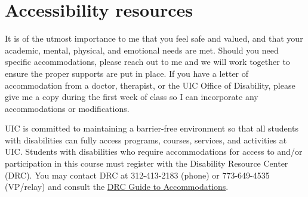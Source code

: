 \documentclass[
]{report}
\begin{document}
\hypertarget{accessibility-resources}{%
\section*{Accessibility resources}\label{accessibility-resources}}

It is of the utmost importance to me that you feel safe and valued, and that your academic, mental, physical, and emotional needs are met. Should you need specific accommodations, please reach out to me and we will work together to ensure the proper supports are put in place. If you have a letter of accommodation from a doctor, therapist, or the UIC Office of Disability, please give me a copy during the first week of class so I can incorporate any accommodations or modifications.

UIC is committed to maintaining a barrier-free environment so that all students with disabilities can fully access programs, courses, services, and activities at UIC. Students with disabilities who require accommodations for access to and/or participation in this course must register with the Disability Resource Center (DRC). You may contact DRC at 312-413-2183 (phone) or 773-649-4535 (VP/relay) and consult the \href{https://drc.uic.edu/guide-to-accommodations/}{DRC Guide to Accommodations}.
\end{document}
